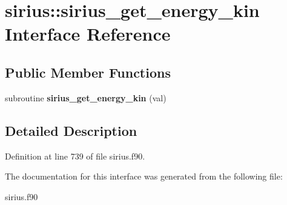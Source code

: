 \hypertarget{interfacesirius_1_1sirius__get__energy__kin}{}\section{sirius\+:\+:sirius\+\_\+get\+\_\+energy\+\_\+kin Interface Reference}
\label{interfacesirius_1_1sirius__get__energy__kin}
\subsection*{Public Member Functions}
\begin{DoxyCompactItemize}
\item 
\hypertarget{interfacesirius_1_1sirius__get__energy__kin_a185aeb90c8109719a521a92e1943cc32}{}subroutine {\bfseries sirius\+\_\+get\+\_\+energy\+\_\+kin} (val)\label{interfacesirius_1_1sirius__get__energy__kin_a185aeb90c8109719a521a92e1943cc32}

\end{DoxyCompactItemize}


\subsection{Detailed Description}


Definition at line 739 of file sirius.\+f90.



The documentation for this interface was generated from the following file\+:\begin{DoxyCompactItemize}
\item 
sirius.\+f90\end{DoxyCompactItemize}

